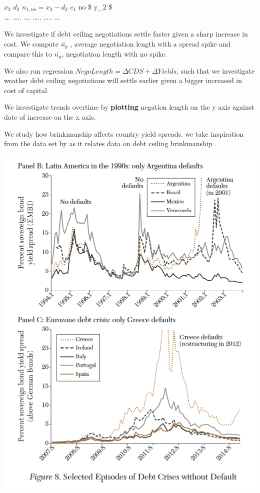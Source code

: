 \documentclass[
  12pt]{article}
\begin{document}
\(x_2\) \textbar{} \(d_2\) \textbar{} \(n_{1,no}=x_2-d_2\) \textbar{}
\(c_1\) \textbar{} no \textbar{} \$ y\_2 \$ \textbar{} \textbar{}\\
\ldots. \textbar{} \ldots.. \textbar{} \ldots. \textbar{} \ldots..
\textbar{} \ldots.. \textbar{} \ldots{} \textbar{} \textbar{}

We investigate if debt ceiling negotiations settle faster given a sharp
increase in cost. We compute \(\bar{n_{y}}\) , average negotiation
length with a spread spike and compare this to \(\bar{n_{n}}\),
negotiation length with no spike.

We also run regression \(NegoLength=\Delta CDS+\Delta Yields\), such
that we investigate weather debt ceiling negotiations will settle
earlier given a bigger increased in cost of capital.

We investigate trends overtime by \textbf{plotting} negation length on
the y axis against date of increase on the x axis.

We study how brinkmanship affects country yield spreads. we take
inspiration from the data set by \citet{meyer2022} as it relates data on
debt ceiling brinkmanship \citet{reinhart2008}.

\includegraphics{style-guide/overtime_brink_2.png}
\end{document}
